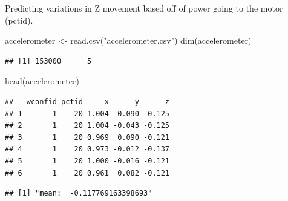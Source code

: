 \documentclass[
]{article}
\newenvironment{Shaded}{\begin{snugshade}}{\end{snugshade}}
\newcommand{\FunctionTok}[1]{\textcolor[rgb]{0.00,0.00,0.00}{#1}}
\newcommand{\NormalTok}[1]{#1}
\newcommand{\OtherTok}[1]{\textcolor[rgb]{0.56,0.35,0.01}{#1}}
\newcommand{\SpecialCharTok}[1]{\textcolor[rgb]{0.00,0.00,0.00}{#1}}
\newcommand{\StringTok}[1]{\textcolor[rgb]{0.31,0.60,0.02}{#1}}
\begin{document}
Predicting variations in Z movement based off of power going to the
motor (pctid).

\begin{Shaded}
\begin{Highlighting}[]
\NormalTok{accelerometer }\OtherTok{\textless{}{-}} \FunctionTok{read.csv}\NormalTok{(}\StringTok{"accelerometer.csv"}\NormalTok{)}
\FunctionTok{dim}\NormalTok{(accelerometer)}
\end{Highlighting}
\end{Shaded}

\begin{verbatim}
## [1] 153000      5
\end{verbatim}

\begin{Shaded}
\begin{Highlighting}[]
\FunctionTok{head}\NormalTok{(accelerometer)}
\end{Highlighting}
\end{Shaded}

\begin{verbatim}
##   wconfid pctid     x      y      z
## 1       1    20 1.004  0.090 -0.125
## 2       1    20 1.004 -0.043 -0.125
## 3       1    20 0.969  0.090 -0.121
## 4       1    20 0.973 -0.012 -0.137
## 5       1    20 1.000 -0.016 -0.121
## 6       1    20 0.961  0.082 -0.121
\end{verbatim}

\begin{Shaded}
\end{Shaded}

\begin{verbatim}
## [1] "mean:  -0.117769163398693"
\end{verbatim}
\end{document}
